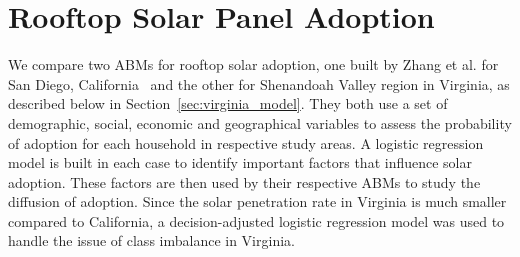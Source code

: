 \section{Rooftop Solar Panel Adoption}
\label{section:rooftop}
We compare two ABMs for rooftop solar adoption, one built by Zhang et al. for San Diego, California~\cite{zhang16solar} and the other for Shenandoah Valley region in Virginia, as described below in Section~\ref{sec:virginia_model}. They both use a set of demographic, social, economic and geographical variables to assess the probability of adoption for each household in respective study areas. A logistic regression model is built in each case to identify important factors that influence solar adoption. These factors are then used by their respective ABMs to study the diffusion of adoption. Since the solar penetration rate in Virginia is much smaller compared to California, a decision-adjusted logistic regression model was used to handle the issue of class imbalance in Virginia.

